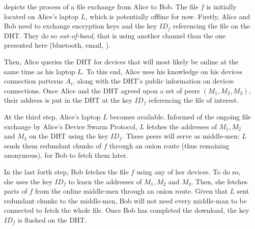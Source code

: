  depicts the process of a file exchange from Alice to Bob.
The file $f$ is initially located on Alice's laptop $L$, which is potentially offline for now.
Firstly, Alice and Bob need to exchange encryption keys and the key $ID_f$ 
referencing the file on the \ac{DHT}.
They do so \emph{out-of-band}, that is using another channel than the one 
presented here (\eg bluetooth, email, \etc).

Then, Alice queries the DHT for devices that will most likely be online at the same time as his laptop $L$.
To this end, Alice uses his knowledge on his devices connection patterns $A_i$, along with the DHT's public information on devices connections.
Once Alice and the DHT agreed upon a set of peers $(M_1, M_2, M_3)$, their address is put in the DHT at the key $ID_f$ referencing the file of interest.

At the third step, Alice's laptop $L$ becomes available. 
Informed of the ongoing file exchange by Alice's Device Swarm Protocol, $L$ fetches the addresses of $M_1, M_2$ and $M_3$ on the DHT using the key $ID_f$.
These peers will serve as middle-men: $L$ sends them redundant chunks of $f$ through an onion route (thus remaining anonymous), for Bob to fetch them later.

In the last forth step, Bob fetches the file $f$ using any of her devices.
To do so, she uses the key $ID_f$ to learn the addresses of $M_1, M_2$ and $M_3$.
Then, she fetches parts of $f$ from the online middle-men through an onion route.
Given that $L$ sent redundant chunks to the middle-men, Bob will not need every middle-man to be connected to fetch the whole file.
Once Bob has completed the download, the key $ID_f$ is flushed on the DHT.


